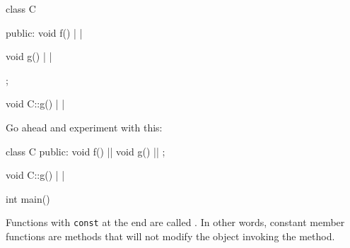 

\begin{consolethree}[escapeinside=||]
class C
{
public:
    void f() |  |
    {}
    
    void g() | |
};

void C::g() |  |
{}
\end{consolethree}
Go ahead and experiment with this:

\begin{consolethree}[escapeinside=||]
class C{
public:
    void f() || 
    {}
    void g() || 
};

void C::g() |  |
{}

int main()
{}
\end{consolethree}


Functions with \texttt{const} at the end are called . In other words, constant member functions
are methods that will not modify the object invoking the method.








